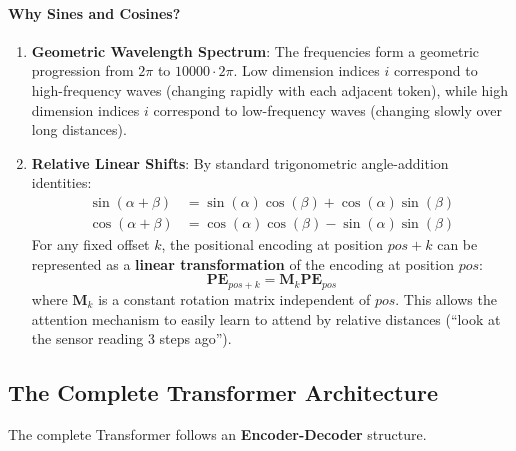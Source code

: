 \paragraph{Why Sines and Cosines?}
\begin{enumerate}
    \item \textbf{Geometric Wavelength Spectrum}: The frequencies form a geometric progression from $2\pi$ to $10000 \cdot 2\pi$. Low dimension indices $i$ correspond to high-frequency waves (changing rapidly with each adjacent token), while high dimension indices $i$ correspond to low-frequency waves (changing slowly over long distances).
    \item \textbf{Relative Linear Shifts}: By standard trigonometric angle-addition identities:
    \begin{align*}
    \sin(\alpha + \beta) &= \sin(\alpha)\cos(\beta) + \cos(\alpha)\sin(\beta) \\
    \cos(\alpha + \beta) &= \cos(\alpha)\cos(\beta) - \sin(\alpha)\sin(\beta)
    \end{align*}
    For any fixed offset $k$, the positional encoding at position $pos + k$ can be represented as a \textbf{linear transformation} of the encoding at position $pos$:
    \begin{equation}
    \mathbf{PE}_{pos+k} = \mathbf{M}_k \mathbf{PE}_{pos}\label{eq:linear_pe}
    \end{equation}
    where $\mathbf{M}_k$ is a constant rotation matrix independent of $pos$. This allows the attention mechanism to easily learn to attend by relative distances (``look at the sensor reading 3 steps ago'').
\end{enumerate}

\subsection{The Complete Transformer Architecture}\label{subsec:full_transformer}

The complete Transformer follows an \textbf{Encoder-Decoder} structure.

